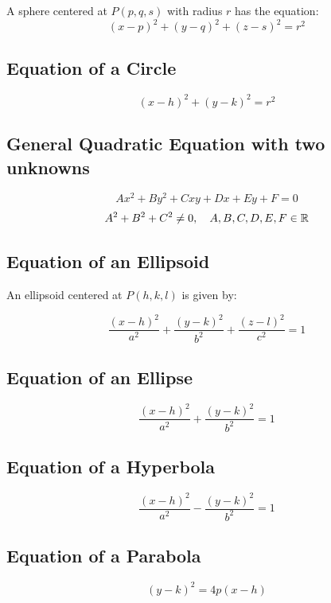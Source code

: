 A sphere centered at \(P(p, q, s)\) with radius \( r \) has the equation:
\begin{equation}\label{Equation of a Sphere}
    (x - p)^2 + (y - q)^2 + (z - s)^2 = r^2
\end{equation}

\subsection{Equation of a Circle}
\begin{equation}\label{Equation of a Circle}
    (x-h)^2 + (y-k)^2 = r^2
\end{equation}

\subsection{General Quadratic Equation with two unknowns}
\begin{equation}\label{General Quadratic Equation}
    Ax^2 + By^2 + Cxy + Dx + Ey + F = 0
\end{equation}
\[
    A^2 + B^2 + C^2 \neq 0, \quad A, B, C, D, E, F \in \mathbb{R}
\]
\subsection{Equation of an Ellipsoid}

An ellipsoid centered at \(P(h, k, l)\) is given by:

\begin{equation}\label{Equation of an Ellipsoid}
    \dfrac{(x-h)^2}{a^2} +  
    \dfrac{(y-k)^2}{b^2} + 
    \dfrac{(z-l)^2}{c^2} = 1
\end{equation}

\subsection{Equation of an Ellipse}
\begin{equation}\label{Equation of an Ellipse}
    \dfrac{(x-h)^2}{a^2} + \dfrac{(y-k)^2}{b^2} = 1
\end{equation}

\subsection{Equation of a Hyperbola}
\begin{equation}\label{Equation of a Hyperbola}
    \dfrac{(x-h)^2}{a^2} - \dfrac{(y-k)^2}{b^2} = 1
\end{equation}
\subsection{Equation of a Parabola}
\begin{equation}\label{Equation of a Parabola}
    (y-k)^2 = 4p(x-h)
\end{equation}

